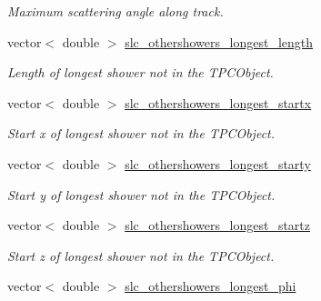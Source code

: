 \begin{DoxyCompactItemize}
\begin{DoxyCompactList}\small\item\em Maximum scattering angle along track. \end{DoxyCompactList}\item 
\hypertarget{classUBXSecEvent_a88a28d15f2610291b3cb37b15335ca20}{vector$<$ double $>$ \hyperlink{classUBXSecEvent_a88a28d15f2610291b3cb37b15335ca20}{slc\-\_\-othershowers\-\_\-longest\-\_\-length}}\label{classUBXSecEvent_a88a28d15f2610291b3cb37b15335ca20}

\begin{DoxyCompactList}\small\item\em Length of longest shower not in the T\-P\-C\-Object. \end{DoxyCompactList}\item 
\hypertarget{classUBXSecEvent_a6e6fbefbd4ffc86a1987dfdd8eafc1df}{vector$<$ double $>$ \hyperlink{classUBXSecEvent_a6e6fbefbd4ffc86a1987dfdd8eafc1df}{slc\-\_\-othershowers\-\_\-longest\-\_\-startx}}\label{classUBXSecEvent_a6e6fbefbd4ffc86a1987dfdd8eafc1df}

\begin{DoxyCompactList}\small\item\em Start x of longest shower not in the T\-P\-C\-Object. \end{DoxyCompactList}\item 
\hypertarget{classUBXSecEvent_ad21ee017ae26cebdf91a9c95264f9b04}{vector$<$ double $>$ \hyperlink{classUBXSecEvent_ad21ee017ae26cebdf91a9c95264f9b04}{slc\-\_\-othershowers\-\_\-longest\-\_\-starty}}\label{classUBXSecEvent_ad21ee017ae26cebdf91a9c95264f9b04}

\begin{DoxyCompactList}\small\item\em Start y of longest shower not in the T\-P\-C\-Object. \end{DoxyCompactList}\item 
\hypertarget{classUBXSecEvent_a3f6228996c37c36970d12027ad4f18c0}{vector$<$ double $>$ \hyperlink{classUBXSecEvent_a3f6228996c37c36970d12027ad4f18c0}{slc\-\_\-othershowers\-\_\-longest\-\_\-startz}}\label{classUBXSecEvent_a3f6228996c37c36970d12027ad4f18c0}

\begin{DoxyCompactList}\small\item\em Start z of longest shower not in the T\-P\-C\-Object. \end{DoxyCompactList}\item 
\hypertarget{classUBXSecEvent_a8a628a8cfd9d1de43eada6624bfe507e}{vector$<$ double $>$ \hyperlink{classUBXSecEvent_a8a628a8cfd9d1de43eada6624bfe507e}{slc\-\_\-othershowers\-\_\-longest\-\_\-phi}}\label{classUBXSecEvent_a8a628a8cfd9d1de43eada6624bfe507e}


\end{DoxyCompactItemize}
